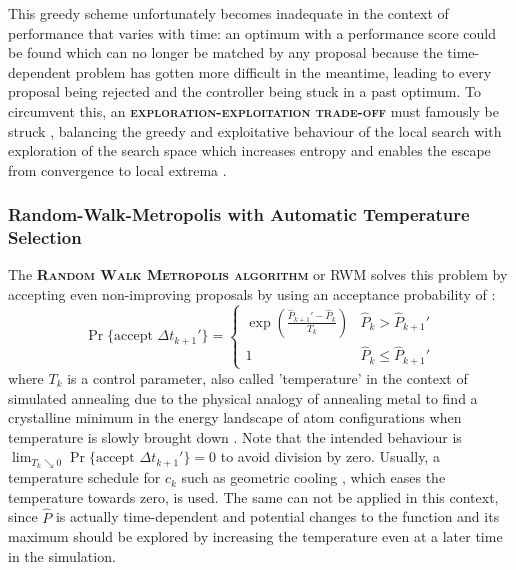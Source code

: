 \documentclass[oneside, a4paper]{book}
\newcommand\emphasis[1]{{\scshape\bfseries#1}}
\newcommand\br[1]{\left(#1\right)}
\begin{document}

    This greedy scheme unfortunately becomes inadequate in the context of performance that varies with time: an optimum with a performance score could be found which can no longer be matched by any proposal because the time-dependent problem has gotten more difficult in the meantime, leading to every proposal being rejected and the controller being stuck in a past optimum. To circumvent this, an \emphasis{exploration-exploitation trade-off} must famously be struck \autocite{bbo-bayesian-phd}, balancing the greedy and exploitative behaviour of the local search with exploration of the search space which increases entropy and enables the escape from convergence to local extrema \autocite{simulated-annealing}.
    
    \subsubsection{Random-Walk-Metropolis with Automatic Temperature Selection}
    The \emphasis{Random Walk Metropolis algorithm} or RWM solves this problem by accepting even non-improving proposals by using an acceptance probability of \autocite{simulated-annealing}:
    \begin{equation}\label{eq:acceptance-prob}
      \Pr\{\text{accept }\Delta t_{k+1}'\} = \begin{cases}
        \exp\br{\frac{\hat{P}_{k+1}'- \hat{P}_k}{T_k}} 
        &\hat{P}_k>\hat{P}_{k+1}'\\
        1 
        &\hat{P}_k\leq\hat{P}_{k+1}'
      \end{cases}
    \end{equation}
    where $T_k$ is a control parameter, also called 'temperature' in the context of simulated annealing \autocite{simulated-annealing} due to the physical analogy of annealing metal to find a crystalline minimum in the energy landscape of atom configurations when temperature is slowly brought down \autocite{simulated-annealing}. Note that the intended behaviour is $\lim_{T_k\searrow 0} \Pr\{\text{accept }\Delta t_{k+1}'\}=0$ to avoid division by zero. Usually, a temperature schedule for $c_k$ such as geometric cooling \autocite{simulated-annealing}, which eases the temperature towards zero, is used. The same can not be applied in this context, since $\hat{P}$ is actually time-dependent and potential changes to the function and its maximum should be explored by increasing the temperature even at a later time in the simulation.
    
\end{document}
